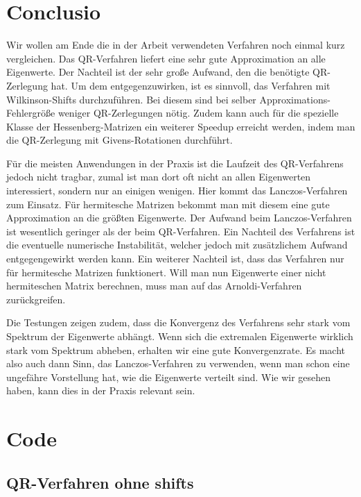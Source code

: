 \documentclass{article}
\theoremstyle{plain}
\begin{document}
\section{Conclusio}

Wir wollen am Ende die in der Arbeit verwendeten Verfahren noch einmal kurz vergleichen. Das QR-Verfahren liefert eine sehr gute Approximation an alle Eigenwerte. Der Nachteil ist der sehr große Aufwand, den die benötigte QR-Zerlegung hat. Um dem entgegenzuwirken, ist es sinnvoll, das Verfahren mit Wilkinson-Shifts durchzuführen. Bei diesem sind bei selber Approximations-Fehlergröße weniger QR-Zerlegungen nötig. Zudem kann auch für die spezielle Klasse der Hessenberg-Matrizen ein weiterer Speedup erreicht werden, indem man die QR-Zerlegung mit Givens-Rotationen durchführt.

Für die meisten Anwendungen in der Praxis ist die Laufzeit des QR-Verfahrens jedoch nicht tragbar, zumal ist man dort oft nicht an allen Eigenwerten interessiert, sondern nur an einigen wenigen. Hier kommt das Lanczos-Verfahren zum Einsatz. Für hermitesche Matrizen bekommt man mit diesem eine gute Approximation an die größten Eigenwerte. Der Aufwand beim Lanczos-Verfahren ist wesentlich geringer als der beim QR-Verfahren. Ein Nachteil des Verfahrens ist die eventuelle numerische Instabilität, welcher jedoch mit zusätzlichem Aufwand entgegengewirkt werden kann. Ein weiterer Nachteil ist, dass das Verfahren nur für hermitesche Matrizen funktionert. Will man nun Eigenwerte einer nicht hermiteschen Matrix berechnen, muss man auf das Arnoldi-Verfahren zurückgreifen.

Die Testungen zeigen zudem, dass die Konvergenz des Verfahrens sehr stark vom Spektrum der Eigenwerte abhängt. Wenn sich die extremalen Eigenwerte wirklich stark vom Spektrum abheben, erhalten wir eine gute Konvergenzrate. Es macht also auch dann Sinn, das Lanczos-Verfahren zu verwenden, wenn man schon eine ungefähre Vorstellung hat, wie die Eigenwerte verteilt sind. Wie wir gesehen haben, kann dies in der Praxis relevant sein.

\newpage
\pagestyle{plain}
\section*{Code}

\subsection*{QR-Verfahren ohne shifts}
\end{document}
